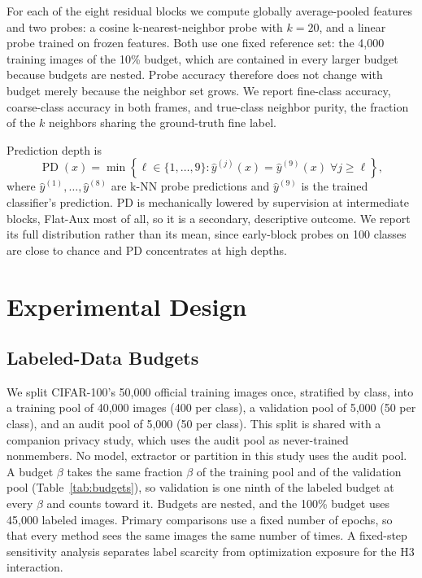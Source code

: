 \documentclass[conference]{IEEEtran}
\begin{document}
For each of the eight residual blocks we compute globally average-pooled features and two probes: a cosine k-nearest-neighbor probe with $k=20$, and a linear probe trained on frozen features. Both use one fixed reference set: the 4,000 training images of the 10\% budget, which are contained in every larger budget because budgets are nested. Probe accuracy therefore does not change with budget merely because the neighbor set grows. We report fine-class accuracy, coarse-class accuracy in both frames, and true-class neighbor purity, the fraction of the $k$ neighbors sharing the ground-truth fine label.

Prediction depth \cite{baldock2021difficulty} is
\begin{equation}
\operatorname{PD}(x)=\min\left\{\ell\in\{1,\ldots,9\}:\hat y^{(j)}(x)=\hat y^{(9)}(x)\;\forall j\geq\ell\right\},
\label{eq:pd}
\end{equation}
where $\hat y^{(1)},\ldots,\hat y^{(8)}$ are k-NN probe predictions and $\hat y^{(9)}$ is the trained classifier's prediction. PD is mechanically lowered by supervision at intermediate blocks, Flat-Aux most of all, so it is a secondary, descriptive outcome. We report its full distribution rather than its mean, since early-block probes on 100 classes are close to chance and PD concentrates at high depths.

\section{Experimental Design}
\label{sec:experiments}

\subsection{Labeled-Data Budgets}
We split CIFAR-100's 50,000 official training images once, stratified by class, into a training pool of 40,000 images (400 per class), a validation pool of 5,000 (50 per class), and an audit pool of 5,000 (50 per class). This split is shared with a companion privacy study, which uses the audit pool as never-trained nonmembers. No model, extractor or partition in this study uses the audit pool. A budget $\beta$ takes the same fraction $\beta$ of the training pool and of the validation pool (Table~\ref{tab:budgets}), so validation is one ninth of the labeled budget at every $\beta$ and counts toward it. Budgets are nested, and the 100\% budget uses 45,000 labeled images. Primary comparisons use a fixed number of epochs, so that every method sees the same images the same number of times. A fixed-step sensitivity analysis separates label scarcity from optimization exposure for the H3 interaction.
\end{document}
